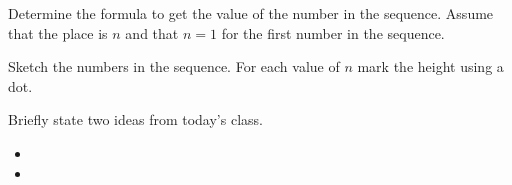 \begin{problem}
    \begin{subproblem}
    \item Determine the formula to get the value of the number in the
      sequence. Assume that the place is $n$ and that $n=1$ for the
      first number in the sequence.  

      \vfill

    \item Sketch the numbers in the sequence. For each value of $n$
      mark the height using a dot.

      \scalebox{0.8}{}

    \end{subproblem}


\end{problem}


\postClass

\begin{problem}
\item Briefly state two ideas from today's class.
  \begin{itemize}
  \item 
  \item 
  \end{itemize}
\item 
  \begin{subproblem}
    \item
  \end{subproblem}
\end{problem}




\begin{problem}
\item
\end{problem}


